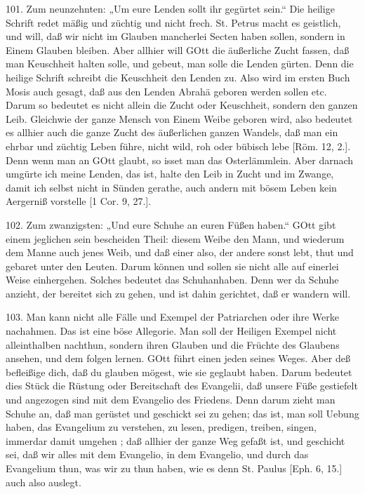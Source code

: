 101. Zum neunzehnten: „Um eure Lenden sollt ihr gegürtet sein.“ Die heilige Schrift redet mäßig und züchtig und nicht frech. St. Petrus macht es geistlich, und will, daß wir nicht im Glauben mancherlei Secten haben sollen, sondern in Einem Glauben bleiben. Aber allhier will GOtt die äußerliche Zucht fassen, daß man Keuschheit halten solle, und gebeut, man solle die Lenden gürten. Denn die heilige Schrift schreibt die Keuschheit den Lenden zu. Also wird im ersten Buch Mosis auch gesagt, daß aus den Lenden Abrahä geboren werden sollen etc. Darum so bedeutet es nicht allein die Zucht oder Keuschheit, sondern den ganzen Leib. Gleichwie der ganze Mensch von Einem Weibe geboren wird, also bedeutet es allhier auch die ganze Zucht des äußerlichen ganzen Wandels, daß man ein ehrbar und züchtig Leben führe, nicht wild, roh oder bübisch lebe [Röm. 12, 2.]. Denn wenn man an GOtt glaubt, so isset man das Osterlämmlein. Aber darnach umgürte ich meine Lenden, das ist, halte den Leib in Zucht und im Zwange, damit ich selbst nicht in Sünden gerathe, auch andern mit bösem Leben kein Aergerniß vorstelle [1 Cor. 9, 27.].

102. Zum zwanzigsten: „Und eure Schuhe an euren Füßen haben.“ GOtt gibt einem jeglichen sein bescheiden Theil: diesem Weibe den Mann, und wiederum dem Manne auch jenes Weib, und daß einer also, der andere sonst lebt, thut und gebaret unter den Leuten. Darum können und sollen sie nicht alle auf einerlei Weise einhergehen. Solches bedeutet das Schuhanhaben. Denn wer da Schuhe anzieht, der bereitet sich zu gehen, und ist dahin gerichtet, daß er wandern will.

103. Man kann nicht alle Fälle und Exempel der Patriarchen oder ihre Werke nachahmen. Das ist eine böse Allegorie. Man soll der Heiligen Exempel nicht alleinthalben nachthun, sondern ihren Glauben und die Früchte des Glaubens ansehen, und dem folgen lernen. GOtt führt einen jeden seines Weges. Aber deß befleißige dich, daß du glauben mögest, wie sie geglaubt haben. Darum bedeutet dies Stück die Rüstung oder Bereitschaft des Evangelii, daß unsere Füße gestiefelt und angezogen sind mit dem Evangelio des Friedens. Denn darum zieht man Schuhe an, daß man gerüstet und geschickt sei zu gehen; das ist, man soll Uebung haben, das Evangelium zu verstehen, zu lesen, predigen, treiben, singen, immerdar damit umgehen
; daß allhier der ganze Weg gefaßt ist, und geschicht sei, daß wir alles mit dem Evangelio, in dem Evangelio, und durch das Evangelium thun, was wir zu thun haben, wie es denn St. Paulus [Eph. 6, 15.] auch also auslegt.


